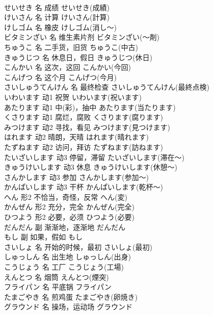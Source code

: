 \documentclass[8pt]{extreport}
\begin{document}
\begin{CJK}{UTF8}{min}
\\	せいせき	名	成绩	せいせき(成績)	
\\	けいさん	名	计算	けいさん(計算)	
\\	けしゴム	名	橡皮	けしゴム(消し～)	
\\	ビタミンざい	名	维生素片剂	ビタミンざい(～剤)	
\\	ちゅうこ	名	二手货，旧货	ちゅうこ(中古)	
\\	きゅうじつ	名	休息日，假日	きゅうじつ(休日)	
\\	こんかい	名	这次，这回	こんかい(今回)	
\\	こんげつ	名	这个月	こんげつ(今月)	
\\	さいしゅうてんけん	名	最终检查	さいしゅうてんけん(最終点検)	
\\	いわいます	动1	祝贺	いわいます(祝います)	
\\	あたります	动1	中(彩)，抽中	あたります(当たります)	
\\	くさります	动1	腐烂，腐败	くさります(腐ります)	
\\	みつけます	动2	寻找，看见	みつけます(見つけます)	
\\	はれます	动2	晴朗，天晴	はれます(晴れます)	
\\	たずねます	动2	访问，拜访	たずねます(訪ねます)	
\\	たいざいします	动3	停留，滞留	たいざいします(滞在～)	
\\	きゅうけいします	动3	休息	きゅうけいします(休憩～)	
\\	さんかします	动3	参加	さんかします(参加～)	
\\	かんぱいします	动3	干杯	かんぱいします(乾杯～)	
\\	へん	形2	不恰当，奇怪，反常	へん(変)	
\\	かんぜん	形2	充分，完全	かんぜん(完全)	
\\	ひつよう	形2	必要，必须	ひつよう(必要)	
\\	だんだん	副	渐渐地，逐渐地	だんだん	
\\	もし	副	如果，假如	もし	
\\	さいしょ	名	开始的时候，最初	さいしょ(最初)	
\\	しゅっしん	名	出生地	しゅっしん(出身)	
\\	こうじょう	名	工厂	こうじょう(工場)	
\\	えんとつ	名	烟筒	えんとつ(煙突)	
\\	フライパン	名	平底锅	フライパン	
\\	たまごやき	名	煎鸡蛋	たまごやき(卵焼き)	
\\	グラウンド	名	操场，运动场	グラウンド	

\end{CJK}
\end{document}
